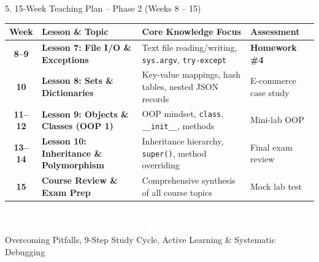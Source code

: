 \documentclass[aspectratio=169, 10pt]{beamer}
\begin{document}
\begin{frame}{5. 15-Week Teaching Plan -- Phase 2 (Weeks 8 -- 15)}
  \scriptsize
  \begin{tabularx}{\textwidth}{c l X l}
    \toprule
    \textbf{Week} & \textbf{Lesson \& Topic} & \textbf{Core Knowledge Focus} & \textbf{Assessment} \\
    \midrule
    \textbf{8--9} & \textbf{Lesson 7: File I/O \& Exceptions} & Text file reading/writing, \texttt{sys.argv}, \texttt{try-except} & \textbf{Homework \#4} \\
    \textbf{10} & \textbf{Lesson 8: Sets \& Dictionaries} & Key-value mappings, hash tables, nested JSON records & E-commerce case study \\
    \textbf{11--12} & \textbf{Lesson 9: Objects \& Classes (OOP 1)} & OOP mindset, \texttt{class}, \texttt{\_\_init\_\_}, methods & Mini-lab OOP \\
    \textbf{13--14} & \textbf{Lesson 10: Inheritance \& Polymorphism} & Inheritance hierarchy, \texttt{super()}, method overriding & Final exam review \\
    \textbf{15} & \textbf{Course Review \& Exam Prep} & Comprehensive synthesis of all course topics & Mock lab test \\
    \bottomrule
  \end{tabularx}
\end{frame}

\begin{frame}[plain]
  \vfill
  \begin{tcolorbox}[colback=secondarygreen, colframe=secondarygreen, arc=5pt, left=15pt, right=15pt, top=15pt, bottom=15pt]
    \textcolor{white}{\large\textbf{PART 2}}\\[4pt]
    {\LARGE\textbf{\textcolor{white}{EFFECTIVE PYTHON SELF-STUDY METHODS}}}\\[6pt]
    \textcolor{white!80}{\small Overcoming Pitfalls, 9-Step Study Cycle, Active Learning \& Systematic Debugging}
  \end{tcolorbox}
  \vfill
\end{frame}
\end{document}
